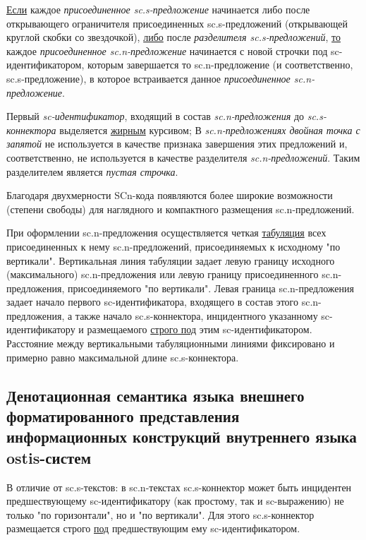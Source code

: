 \uline{Если} каждое \textit{присоединенное sc.s-предложение} начинается либо после открывающего ограничителя присоединенных sc.s-предложений (открывающей круглой скобки со звездочкой), \uline{либо} после \textit{разделителя sc.s-предложений}, \uline{то} каждое \textit{присоединенное sc.n-предложение} начинается с новой строчки под sc-идентификатором, которым завершается то sc.n-предложение (и соответственно, sc.s-предложение), в которое встраивается данное \textit{присоединенное sc.n-предложение}.

Первый \textit{sc-идентификатор}, входящий в состав \textit{sc.n-предложения} до \textit{sc.s-коннектора} выделяется \uline{жирным} курсивом;
В \textit{sc.n-предложениях двойная точка с запятой} не используется в качестве признака завершения этих предложений и, соответственно, не используется в качестве разделителя \textit{sc.n-предложений}. Таким разделителем является \textit{пустая строчка}.

Благодаря двухмерности SCn-кода появляются более широкие возможности (степени свободы) для наглядного и компактного размещения sc.n-предложений.

При оформлении sc.n-предложения осуществляется четкая \uline{табуляция} всех присоединенных к нему sc.n-предложений, присоединяемых к исходному "по вертикали"{}. Вертикальная линия табуляции задает левую границу исходного (максимального) sc.n-предложения или левую границу присоединенного sc.n-предложения, присоединяемого "по вертикали". Левая граница sc.n-предложения задает начало первого sc-идентификатора, входящего в состав этого \mbox{sc.n-предложения}, а также начало sc.s-коннектора, инцидентного указанному \mbox{sc-идентификатору} и размещаемого \uline{строго под} этим sc-идентификатором. Расстояние между вертикальными табуляционными линиями фиксировано и примерно равно максимальной длине sc.s-коннектора.

\subsection{Денотационная семантика языка внешнего форматированного представления информационных конструкций внутреннего языка ostis-систем}


В отличие от sc.s-текстов: в sc.n-текстах sc.s-коннектор может быть инцидентен предшествующему sc-идентификатору (как простому, так и sc-выражению) не только "по горизонтали"{}, но и "по вертикали"{}. Для этого sc.s-коннектор размещается строго \uline{под} предшествующим ему sc-идентификатором.

